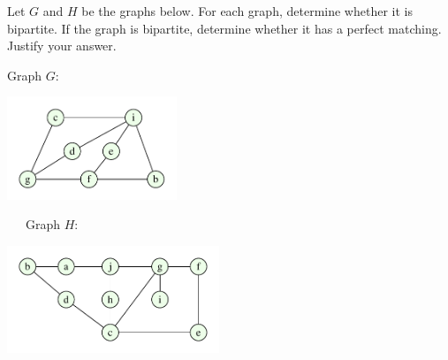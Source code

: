 \documentclass{article}
\begin{document}
\begin{problem}
Let $G$ and $H$ be the graphs below. For each graph, determine
whether it is bipartite. 
If the graph is bipartite, determine whether it has a perfect matching.
Justify your answer.
%
\begin{center}
{\large Graph $G$:\ }
\begin{minipage}{2in}
        \includegraphics[width=2in]{HW5_pics/graph3_hw5.pdf}
\end{minipage}
\ \ \
{\large Graph $H$:\ }
\begin{minipage}{2.5in}
        \includegraphics[width=2.5in]{HW5_pics/graph4_hw5.pdf}
\end{minipage}
\hfill
\end{center}
\end{problem}
\end{document}
